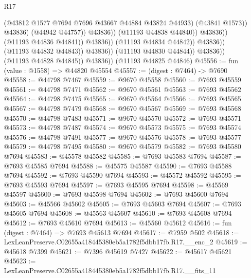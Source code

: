 \begin{lexlean}{R17}
\begin{coremodule}
                                                  (@43812
                                                    @1577
                                                    @7694
                                                    @7696
                                                    @43667
                                                    @44884
                                                    @43824
                                                    @44933)
                                                  (@43841 @1573))
                                                @43836)
                                              (@44942 @44757))
                                            @43836))
                                        (@11193 @44838 @44840))
                                      @43836))
                                  (@11193 @44836 @44841))
                                @43836))
                            (@11193 @44834 @44842))
                          @43836))
                      (@11193 @44832 @44843))
                    @43836))
                (@11193 @44830 @44844))
              @43836))
          (@11193 @44828 @44845))
        @43836))
    (@11193 @44825 @44846)
@45556 := fun (value : @1558) => @44820 @45554
@45557 := (digest : @7464) -> @7690
@45558 := @44798 @7467
@45559 := @9670 @45558
@45560 := @7693 @45559
@45561 := @44798 @7471
@45562 := @9670 @45561
@45563 := @7693 @45562
@45564 := @44798 @7475
@45565 := @9670 @45564
@45566 := @7693 @45565
@45567 := @44798 @7479
@45568 := @9670 @45567
@45569 := @7693 @45568
@45570 := @44798 @7483
@45571 := @9670 @45570
@45572 := @7693 @45571
@45573 := @44798 @7487
@45574 := @9670 @45573
@45575 := @7693 @45574
@45576 := @44798 @7491
@45577 := @9670 @45576
@45578 := @7693 @45577
@45579 := @44798 @7495
@45580 := @9670 @45579
@45582 := @7693 @45580 @7694
@45583 := @45578 @45582
@45585 := @7693 @45583 @7694
@45587 := @7693 @45585 @7694
@45588 := @45575 @45587
@45590 := @7693 @45588 @7694
@45592 := @7693 @45590 @7694
@45593 := @45572 @45592
@45595 := @7693 @45593 @7694
@45597 := @7693 @45595 @7694
@45598 := @45569 @45597
@45600 := @7693 @45598 @7694
@45602 := @7693 @45600 @7694
@45603 := @45566 @45602
@45605 := @7693 @45603 @7694
@45607 := @7693 @45605 @7694
@45608 := @45563 @45607
@45610 := @7693 @45608 @7694
@45612 := @7693 @45610 @7694
@45613 := @45560 @45612
@45616 := fun (digest : @7464) => @7693 @45613 @7694
@45617 := @7959 @502
@45618 := LexLeanPreserve.C02655a418445380eb5a1782f5dbb17fb.R17.__enc_2
@45619 := @45618 @7399
@45621 := @7396 @45619 @7427
@45622 := @45617 @45621
@45623 := LexLeanPreserve.C02655a418445380eb5a1782f5dbb17fb.R17.__fits_11

\end{coremodule}
\end{lexlean}
